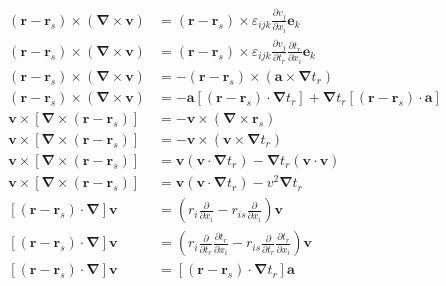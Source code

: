 \begin{align*}
    (\boldsymbol{r}-\boldsymbol{r}_s)\times(\boldsymbol{\nabla}\times\boldsymbol{v})
    &=(\boldsymbol{r}-\boldsymbol{r}_s)\times\varepsilon_{ijk}\frac{\partial v_j}{\partial x_i}\boldsymbol{e}_k\\
    (\boldsymbol{r}-\boldsymbol{r}_s)\times(\boldsymbol{\nabla}\times\boldsymbol{v})
    &=(\boldsymbol{r}-\boldsymbol{r}_s)\times\varepsilon_{ijk}\frac{\partial v_j}{\partial t_r}\frac{\partial t_r}{\partial x_i}\boldsymbol{e}_k\\
    (\boldsymbol{r}-\boldsymbol{r}_s)\times(\boldsymbol{\nabla}\times\boldsymbol{v})
    &=-(\boldsymbol{r}-\boldsymbol{r}_s)\times(\boldsymbol{a}\times\boldsymbol{\nabla}t_r)\\
    (\boldsymbol{r}-\boldsymbol{r}_s)\times(\boldsymbol{\nabla}\times\boldsymbol{v})
    &=-\boldsymbol{a}[(\boldsymbol{r}-\boldsymbol{r}_s) \cdot \boldsymbol{\nabla}t_r] +\boldsymbol{\nabla}t_r[(\boldsymbol{r}-\boldsymbol{r}_s) \cdot \boldsymbol{a}]\\
    \boldsymbol{v}\times[\boldsymbol{\nabla}\times(\boldsymbol{r}-\boldsymbol{r}_s)]
    &=-\boldsymbol{v}\times(\boldsymbol{\nabla}\times\boldsymbol{r}_s)\\
    \boldsymbol{v}\times[\boldsymbol{\nabla}\times(\boldsymbol{r}-\boldsymbol{r}_s)]
    &=-\boldsymbol{v}\times(\boldsymbol{v}\times\boldsymbol{\nabla}t_r)\\
    \boldsymbol{v}\times[\boldsymbol{\nabla}\times(\boldsymbol{r}-\boldsymbol{r}_s)]
    &=\boldsymbol{v}(\boldsymbol{v} \cdot \boldsymbol{\nabla}t_r) - \boldsymbol{\nabla}t_r(\boldsymbol{v} \cdot \boldsymbol{v})\\
    \boldsymbol{v}\times[\boldsymbol{\nabla}\times(\boldsymbol{r}-\boldsymbol{r}_s)]
    &=\boldsymbol{v}(\boldsymbol{v} \cdot \boldsymbol{\nabla}t_r) - v^2\boldsymbol{\nabla}t_r\\
    [(\boldsymbol{r}-\boldsymbol{r}_s)\cdot\boldsymbol{\nabla}]\boldsymbol{v}&=\left(r_i\frac{\partial}{\partial x_i}-r_{is}\frac{\partial}{\partial x_i}\right)\boldsymbol{v}\\
    [(\boldsymbol{r}-\boldsymbol{r}_s)\cdot\boldsymbol{\nabla}]\boldsymbol{v}&=\left(r_i\frac{\partial}{\partial t_r}\frac{\partial t_r}{\partial x_i}-r_{is}\frac{\partial}{\partial t_r}\frac{\partial t_r}{\partial x_i}\right)\boldsymbol{v}\\
    [(\boldsymbol{r}-\boldsymbol{r}_s)\cdot\boldsymbol{\nabla}]\boldsymbol{v}&=\left[(\boldsymbol{r}-\boldsymbol{r}_s)\cdot\boldsymbol{\nabla}t_r\right]\boldsymbol{a}\\

\end{align*}
